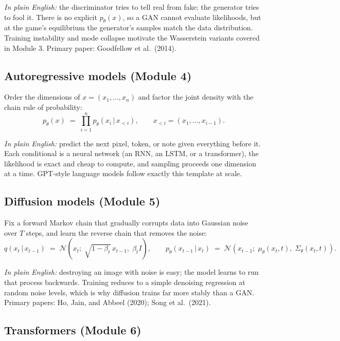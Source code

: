 \documentclass[11pt]{article}
\newcommand{\given}{\,\vert\,}
\theoremstyle{remark}
\begin{document}
\noindent\textit{In plain English:} the discriminator tries to tell real from fake; the generator tries to fool it. There is no explicit $p_\theta(x)$, so a GAN cannot evaluate likelihoods, but at the game's equilibrium the generator's samples match the data distribution. Training instability and mode collapse motivate the Wasserstein variants covered in Module 3. Primary paper: Goodfellow et al.\ (2014).

\subsection{Autoregressive models (Module 4)}

Order the dimensions of $x = (x_1, \dots, x_n)$ and factor the joint density with the chain rule of probability:
\begin{equation}
p_\theta(x) \;=\; \prod_{i=1}^{n} p_\theta\!\left(x_i \given x_{<i}\right), \qquad x_{<i} = (x_1, \dots, x_{i-1}).
\end{equation}

\noindent\textit{In plain English:} predict the next pixel, token, or note given everything before it. Each conditional is a neural network (an RNN, an LSTM, or a transformer), the likelihood is exact and cheap to compute, and sampling proceeds one dimension at a time. GPT-style language models follow exactly this template at scale.

\subsection{Diffusion models (Module 5)}

Fix a forward Markov chain that gradually corrupts data into Gaussian noise over $T$ steps, and learn the reverse chain that removes the noise:
\begin{equation}
q(x_t \given x_{t-1}) \;=\; \mathcal{N}\!\left(x_t;\; \sqrt{1-\beta_t}\, x_{t-1},\; \beta_t I\right), \qquad
p_\theta(x_{t-1} \given x_t) \;=\; \mathcal{N}\!\left(x_{t-1};\; \mu_\theta(x_t, t),\; \Sigma_\theta(x_t, t)\right).
\end{equation}

\noindent\textit{In plain English:} destroying an image with noise is easy; the model learns to run that process backwards. Training reduces to a simple denoising regression at random noise levels, which is why diffusion trains far more stably than a GAN. Primary papers: Ho, Jain, and Abbeel (2020); Song et al.\ (2021).

\subsection{Transformers (Module 6)}
\end{document}
